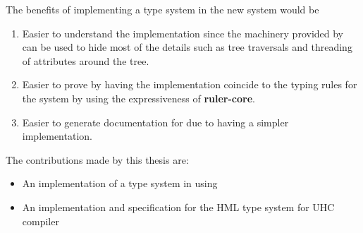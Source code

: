 The benefits of implementing a type system in the new \rcore system would be

\begin{enumerate}
\item Easier to understand the implementation since the machinery provided by \ags can be used to hide most of the details such as tree traversals and threading of attributes around the tree.
\item Easier to prove by having the implementation coincide to the typing rules for the system by using the expressiveness of \textbf{ruler-core}.
\item Easier to generate documentation for due to having a simpler implementation.
\end{enumerate}

The contributions made by this thesis are:
\begin{itemize}
\item An implementation of a type system in \ags using \rcore
\item An implementation and specification for the HML type system for UHC compiler
\end{itemize}
